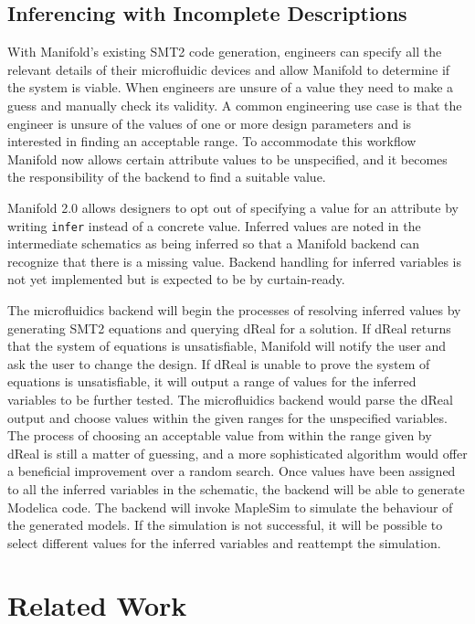 \subsection{Inferencing with Incomplete Descriptions}

With Manifold's existing SMT2 code generation, engineers can specify all the
relevant details of their microfluidic devices and allow Manifold to determine if the system is viable. When engineers
are unsure of a value they need to make a guess and manually check its
validity. A common engineering use case is that the engineer is unsure of the
values of one or more design parameters and is interested in finding an
acceptable range. To accommodate this workflow Manifold now allows certain
attribute values to be unspecified, and it becomes the
responsibility of the backend to find a suitable value.

Manifold 2.0 allows designers to opt out of
specifying a value for an attribute by writing {\tt infer} instead of a
concrete value. Inferred values are noted in the intermediate schematics as
being inferred so that a Manifold backend can recognize that there is a missing value. Backend handling
for inferred variables is not yet implemented but is expected to be by curtain-ready.

The microfluidics backend will begin the processes of resolving inferred values by generating SMT2 equations
and querying dReal for a solution.
If dReal returns that the system of equations is unsatisfiable, Manifold will notify the 
user and ask the user to change the design. If dReal is unable to prove the system of equations is unsatisfiable,
it will output a range of values for the inferred variables to be further tested.
The microfluidics backend would parse the dReal output and choose values within the given ranges for the
unspecified variables.
The process of choosing an acceptable value from within the range given by dReal is still a matter of
guessing, and a more sophisticated algorithm would offer a beneficial improvement over a random search.
Once values have been assigned to all the inferred variables in the schematic, the backend will be able
to generate Modelica code.
The backend will invoke MapleSim to simulate the behaviour of the generated models.
If the simulation is not successful, it will be possible to select different values for the inferred variables
and reattempt the simulation.

\section{Related Work}

